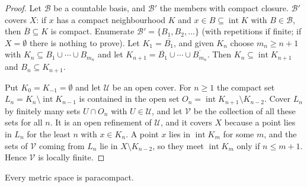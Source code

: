 \begin{proof}
Let $\mathcal{B}$ be a countable basis, and $\mathcal{B}'$ the members with compact closure. $\mathcal{B}'$ covers $X$: if $x$ has a compact neighbourhood $K$ and
$x \in B \subseteq \operatorname{int} K$ with $B \in \mathcal{B}$, then $\overline{B} \subseteq K$ is compact. Enumerate $\mathcal{B}' = \{B_1, B_2, \ldots\}$ (with
repetitions if finite; if $X = \emptyset$ there is nothing to prove). Let $K_1 = \overline{B_1}$, and given $K_n$ choose $m_n \geq n + 1$ with
$K_n \subseteq B_1 \cup \cdots \cup B_{m_n}$ and let $K_{n+1} = \overline{B_1} \cup \cdots \cup \overline{B_{m_n}}$. Then $K_n \subseteq \operatorname{int} K_{n+1}$ and
$B_n \subseteq K_{n+1}$.

Put $K_0 = K_{-1} = \emptyset$ and let $\mathcal{U}$ be an open cover. For $n \geq 1$ the compact set $L_n = K_n \setminus \operatorname{int} K_{n-1}$ is contained in
the open set $O_n = \operatorname{int} K_{n+1} \setminus K_{n-2}$. Cover $L_n$ by finitely many sets $U \cap O_n$ with $U \in \mathcal{U}$, and let $\mathcal{V}$ be
the collection of all these sets for all $n$. It is an open refinement of $\mathcal{U}$, and it covers $X$ because a point lies in $L_n$ for the least $n$
with $x \in K_n$. A point $x$ lies in $\operatorname{int} K_m$ for some $m$, and the sets of $\mathcal{V}$ coming from $L_n$ lie in $X \setminus K_{n-2}$, so they
meet $\operatorname{int} K_m$ only if $n \leq m + 1$. Hence $\mathcal{V}$ is locally finite.
\end{proof}

\begin{theorem}[Stone]\label{general-topology:theorem-stone}
Every metric space is paracompact.
\end{theorem}

